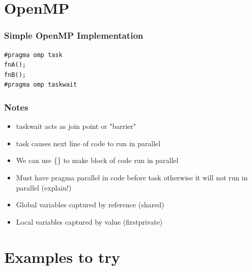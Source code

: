 \documentclass{beamer}
\begin{document}
\section{OpenMP}
  \begin{frame}[fragile=singleslide]
  	\frametitle{Simple OpenMP Implementation}
  	\begin{lstlisting}
#pragma omp task
fnA();
fnB();
#pragma omp taskwait
  	\end{lstlisting}
  \end{frame}
  
  \begin{frame}
  	\frametitle{Notes}
  	
  	\begin{itemize}
  		\item taskwait acts as join point or "barrier"
  		\item task causes next line of code to run in parallel
  		\item We can use \{\} to make block of code run in parallel
  		\item Must have pragma parallel in code before task otherwise it will not run in parallel (explain!)
  		\item Global variables captured by reference (shared)
  		\item Local variables captured by value (firstprivate)
  	\end{itemize}
  \end{frame}
  \section{Examples to try}
 
\end{document}
